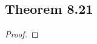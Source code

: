 \documentclass[../../main.tex]{subfiles}
\begin{document}
\subsection{Theorem 8.21}
\begin{wts}

\end{wts}
\begin{proof}

\end{proof}
\end{document}
